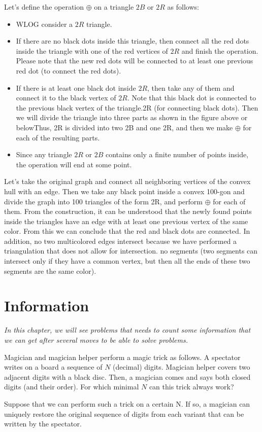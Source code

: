 Let's define the operation $\oplus $ on a triangle $2B$ or $2R$ as follows:
\begin{itemize}
    \item WLOG consider a $2R$ triangle.
    \item If there are no black dots inside this triangle, then connect all the red dots inside the triangle with one of the red vertices of $2R$ and finish the operation. Please note that the new red dots will be connected to at least one previous red dot (to connect the red dots).
    \item If there is at least one black dot inside $2R$, then take any of them and connect it to the black vertex of $2R$. Note that this black dot is connected to the previous black vertex of the triangle.2R (for connecting black dots). Then we will divide the triangle into three parts as shown in the figure above or belowThus, 2R is divided into two 2B and one 2R, and then we make $\oplus $ for each of the resulting parts.
    \item Since any triangle $2R$ or $2B$ contains only a finite number of points inside, the operation will end at some point.
\end{itemize}
Let's take the original graph and connect all neighboring vertices of the convex hull with an edge. Then we take any black point inside a convex 100-gon and divide the graph into 100 triangles of the form 2R, and perform $\oplus $ for each of them. From the construction, it can be understood that the newly found points inside the triangles have an edge with at least one previous vertex of the same color. From this we can conclude that the red and black dots are connected. In addition, no two multicolored edges intersect because we have performed a triangulation that does not allow for intersection.
no segments (two segments can intersect only if they have a common vertex, but then all the ends of these two segments are the same color).

\newpage

\section{Information}
\textit{In this chapter, we will see problems that needs to count some information that we can get after several moves to be able to solve problems.}
\begin{example}
    Magician and magician helper perform a magic trick as follows. A spectator writes on a board a sequence of $N$ (decimal) digits. Magician helper covers two adjacent digits with a black disc. Then, a magician comes and says both closed digits (and their order). For which minimal $N$ can this trick always work? 
\end{example}
\sol
Suppose that we can perform such a trick on a certain N. If so, a magician can uniquely restore the original sequence of digits from each variant that can be written by the spectator. 

